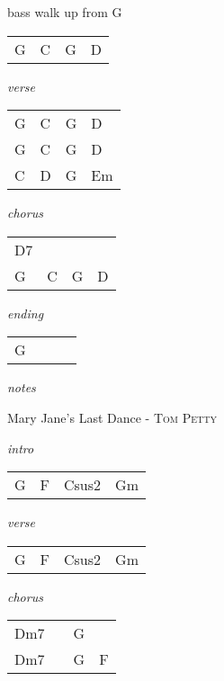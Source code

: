 \documentclass[12pt]{article}
\begin{document}
bass walk up from G

\begin{tabular}{|P{1.25in}|P{1.25in}|P{1.25in}|P{1.25in}|}
  G &  C  &  G  &  D \\
\end{tabular}

\textit{verse}

\begin{tabular}{|P{1.25in}|P{1.25in}|P{1.25in}|P{1.25in}|}
  G &  C  &  G  &  D \\
  G &  C  &  G  &  D \\
  C &  D  &  G  &  Em \\
\end{tabular}

\textit{chorus}

\begin{tabular}{|P{1.25in}|P{1.25in}|P{1.25in}|P{1.25in}|}
  D7 &     &     &   \\
  G  &  C  &  G  &  D \\
\end{tabular}

\textit{ending}

\begin{tabular}{|P{1.25in}|P{1.25in}|P{1.25in}|P{1.25in}|}
  G  &   &   &   \\
\end{tabular}

\textit{notes}



\newpage

{\Huge Mary Jane's Last Dance} {\huge - \textsc{Tom Petty}}

\huge
\textit{intro}

\begin{tabular}{|P{1.25in}|P{1.25in}|P{1.25in}|P{1.25in}|}
  G & F & Csus2  &  Gm \\
\end{tabular}

\textit{verse}

\begin{tabular}{|P{1.25in}|P{1.25in}|P{1.25in}|P{1.25in}|}
  G & F  &  Csus2 &  Gm \\
\end{tabular}

\textit{chorus}

\begin{tabular}{|P{1.25in}|P{1.25in}|P{1.25in}|P{1.25in}|}
  Dm7 &   & G  &   \\
  Dm7 &   & G  &  F \\

\end{tabular}
\end{document}
